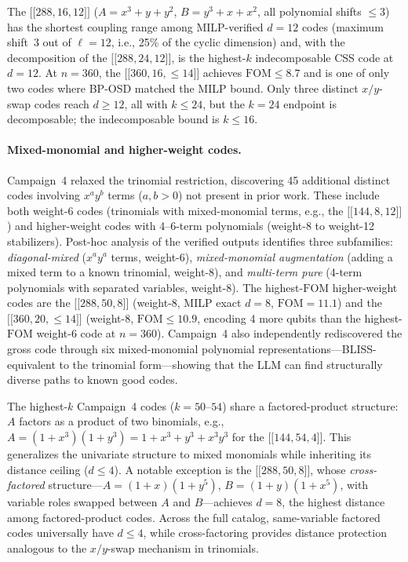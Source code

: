 \documentclass[aps,prxquantum,twocolumn,superscriptaddress,nofootinbib]{revtex4-2}
\newcommand{\dblbrk}[1]{\ensuremath{\lbrack\!\lbrack #1 \rbrack\!\rbrack}}
\newcommand{\code}[1]{\dblbrk{#1}}
\newcommand{\FOM}{\ensuremath{\mathrm{FOM}}}
\begin{document}
The $\code{288,16,12}$ ($A = x^3{+}y{+}y^2$, $B = y^3{+}x{+}x^2$, all polynomial shifts $\leq 3$) has the shortest coupling range among MILP-verified $d = 12$ codes (maximum shift~3 out of $\ell = 12$, i.e., 25\% of the cyclic dimension) and, with the decomposition of the $\code{288,24,12}$, is the highest-$k$ indecomposable CSS code at $d = 12$.
At $n = 360$, the $\code{360,16,{\leq}14}$ achieves $\FOM \leq 8.7$ and is one of only two codes where BP-OSD matched the MILP bound.
Only three distinct $x/y$-swap codes reach $d \geq 12$, all with $k \leq 24$, but the $k = 24$ endpoint is decomposable; the indecomposable bound is $k \leq 16$.

\paragraph{Mixed-monomial and higher-weight codes.} 
Campaign~4 relaxed the trinomial restriction, discovering 45 additional distinct codes involving $x^a y^b$ terms ($a,b > 0$) not present in prior work.
These include both weight-6 codes (trinomials with mixed-monomial terms, e.g., the $\code{144,8,12}$) and higher-weight codes with 4--6-term polynomials (weight-8 to weight-12 stabilizers).
Post-hoc analysis of the verified outputs identifies three subfamilies: \emph{diagonal-mixed} ($x^a y^a$ terms, weight-6), \emph{mixed-monomial augmentation} (adding a mixed term to a known trinomial, weight-8), and \emph{multi-term pure} (4-term polynomials with separated variables, weight-8). 
The highest-$\FOM$ higher-weight codes are the $\code{288,50,8}$ (weight-8, MILP exact $d = 8$, $\FOM = 11.1$) and the $\code{360,20,{\leq}14}$ (weight-8, $\FOM \leq 10.9$, encoding 4 more qubits than the highest-$\FOM$ weight-6 code at $n = 360$). 
Campaign~4 also independently rediscovered the gross code through six mixed-monomial polynomial representations---BLISS-equivalent to the trinomial form---showing that the LLM can find structurally diverse paths to known good codes.

The highest-$k$ Campaign~4 codes ($k = 50$--$54$) share a factored-product structure: $A$ factors as a product of two binomials, e.g., $A = (1{+}x^3)(1{+}y^3) = 1{+}x^3{+}y^3{+}x^3 y^3$ for the $\code{144,54,4}$.
This generalizes the univariate structure to mixed monomials while inheriting its distance ceiling ($d \leq 4$).
A notable exception is the $\code{288,50,8}$, whose \emph{cross-factored} structure---$A = (1{+}x)(1{+}y^5)$, $B = (1{+}y)(1{+}x^5)$, with variable roles swapped between $A$ and $B$---achieves $d = 8$, the highest distance among factored-product codes.
Across the full catalog, same-variable factored codes universally have $d \leq 4$, while cross-factoring provides distance protection analogous to the $x/y$-swap mechanism in trinomials.
\end{document}
